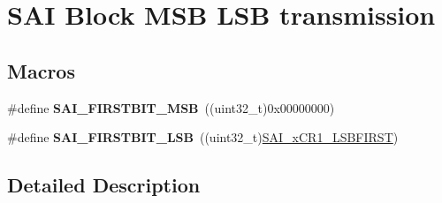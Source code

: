 \hypertarget{group___s_a_i___block___m_s_b___l_s_b__transmission}{}\section{S\+AI Block M\+SB L\+SB transmission}
\label{group___s_a_i___block___m_s_b___l_s_b__transmission}
\subsection*{Macros}
\begin{DoxyCompactItemize}
\item 
\#define {\bfseries S\+A\+I\+\_\+\+F\+I\+R\+S\+T\+B\+I\+T\+\_\+\+M\+SB}~((uint32\+\_\+t)0x00000000)\hypertarget{group___s_a_i___block___m_s_b___l_s_b__transmission_ga1319bca53b9ff37b37376d74b09eb9b2}{}\label{group___s_a_i___block___m_s_b___l_s_b__transmission_ga1319bca53b9ff37b37376d74b09eb9b2}

\item 
\#define {\bfseries S\+A\+I\+\_\+\+F\+I\+R\+S\+T\+B\+I\+T\+\_\+\+L\+SB}~((uint32\+\_\+t)\hyperlink{group___peripheral___registers___bits___definition_ga86dbec701e43531946ca96792b63e5ff}{S\+A\+I\+\_\+x\+C\+R1\+\_\+\+L\+S\+B\+F\+I\+R\+ST})\hypertarget{group___s_a_i___block___m_s_b___l_s_b__transmission_gad308f5f9002d9b6ad2ae0e8abbc96470}{}\label{group___s_a_i___block___m_s_b___l_s_b__transmission_gad308f5f9002d9b6ad2ae0e8abbc96470}

\end{DoxyCompactItemize}


\subsection{Detailed Description}
